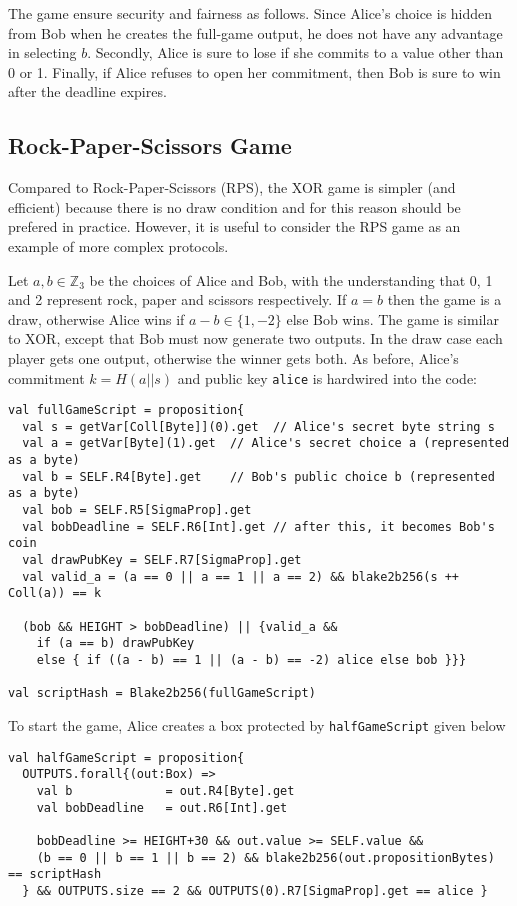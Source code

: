 \documentclass[11pt]{article}
\begin{document}
The game ensure security and fairness as follows. Since Alice's choice is hidden from Bob when he creates the full-game output, he does not have any advantage in selecting $b$. Secondly, Alice is sure to lose if she commits to a value other than 0 or 1. Finally, if Alice refuses to open her commitment, then Bob is sure to win after the deadline expires. 
\subsection{Rock-Paper-Scissors Game}

Compared to Rock-Paper-Scissors (RPS), the XOR game is simpler (and efficient) because there is no draw condition and for this reason should be prefered in practice. However, it is useful to consider the RPS game as an example of more complex protocols.

Let $a, b\in \mathbb{Z}_3$ be the choices of Alice and Bob, with the understanding that 0, 1 and 2 represent rock, paper and scissors respectively. If $a = b$ then the game is a draw, otherwise Alice wins if $a-b \in \{1, -2\}$ else Bob wins. The game is similar to XOR, except that Bob must now generate two outputs. In the draw case each player gets one output, otherwise the winner gets both. 
As before, Alice's commitment $k=H(a||s)$ and public key \texttt{alice} is hardwired into the code:

\begin{verbatim}
val fullGameScript = proposition{
  val s = getVar[Coll[Byte]](0).get  // Alice's secret byte string s
  val a = getVar[Byte](1).get  // Alice's secret choice a (represented as a byte)
  val b = SELF.R4[Byte].get    // Bob's public choice b (represented as a byte)
  val bob = SELF.R5[SigmaProp].get
  val bobDeadline = SELF.R6[Int].get // after this, it becomes Bob's coin
  val drawPubKey = SELF.R7[SigmaProp].get
  val valid_a = (a == 0 || a == 1 || a == 2) && blake2b256(s ++ Coll(a)) == k

  (bob && HEIGHT > bobDeadline) || {valid_a &&
    if (a == b) drawPubKey
    else { if ((a - b) == 1 || (a - b) == -2) alice else bob }}}
    
val scriptHash = Blake2b256(fullGameScript)
\end{verbatim}

To start the game, Alice creates a box protected by \texttt{halfGameScript} given below

\begin{verbatim}
val halfGameScript = proposition{
  OUTPUTS.forall{(out:Box) =>
    val b             = out.R4[Byte].get
    val bobDeadline   = out.R6[Int].get

    bobDeadline >= HEIGHT+30 && out.value >= SELF.value &&
    (b == 0 || b == 1 || b == 2) && blake2b256(out.propositionBytes) == scriptHash
  } && OUTPUTS.size == 2 && OUTPUTS(0).R7[SigmaProp].get == alice }
\end{verbatim}
\end{document}
